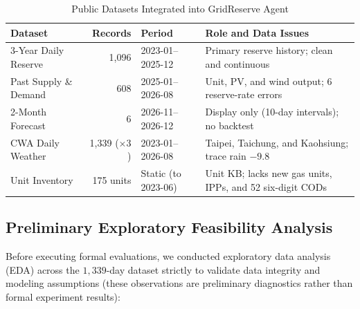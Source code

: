 \documentclass[conference]{IEEEtran}
\begin{document}
\begin{table}[t]
\centering
\caption{Public Datasets Integrated into GridReserve Agent}
\label{tab:datasets}
\footnotesize
\renewcommand{\arraystretch}{1.12}
\setlength{\tabcolsep}{2pt}
\begin{tabularx}{\columnwidth}{@{}p{1.25cm}r p{1.45cm}>{\raggedright\arraybackslash}X@{}}
\toprule
\textbf{Dataset} & \textbf{Records} & \textbf{Period} & \textbf{Role and Data Issues} \\
\midrule
3-Year Daily Reserve \cite{ref3} & 1,096 & 2023-01--2025-12 & Primary reserve history; clean and continuous \\
Past Supply \& Demand \cite{ref1} & 608 & 2025-01--2026-08 & Unit, PV, and wind output; 6 reserve-rate errors \\
2-Month Forecast \cite{ref2} & 6 & 2026-11--2026-12 & Display only (10-day intervals); no backtest \\
CWA Daily Weather \cite{ref6} & 1,339 ($\times 3$) & 2023-01--2026-08 & Taipei, Taichung, and Kaohsiung; trace rain $-9.8$ \\
Unit Inventory \cite{ref5} & 175 units & Static (to 2023-06) & Unit KB; lacks new gas units, IPPs, and 52 six-digit CODs \\
\bottomrule
\end{tabularx}
\end{table}

\subsection{Preliminary Exploratory Feasibility Analysis}
\label{sec:preliminary_eda}

Before executing formal evaluations, we conducted exploratory data analysis (EDA) across the $1{,}339$-day dataset strictly to validate data integrity and modeling assumptions (these observations are preliminary diagnostics rather than formal experiment results):
\end{document}
